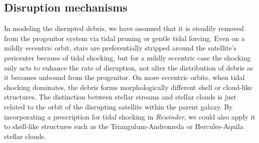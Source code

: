 \documentclass[letterpaper,12pt,preprint]{aastex}
\newcommand{\rewinder}{\emph{Rewinder}}
\begin{document}
\subsection{Disruption mechanisms}
In modeling the disrupted debris, we have assumed that it is steadily removed from the progenitor system via tidal pruning or gentle tidal forcing. Even on a mildly eccentric orbit, stars are preferentially stripped around the satellite's pericenter because of tidal shocking, but for a mildly eccentric case the shocking only acts to enhance the rate of disruption, not alter the distribution of debris as it becomes unbound from the progenitor. On more eccentric orbits, when tidal shocking dominates, the debris forms morphologically different shell or cloud-like structures. The distinction between stellar streams and stellar clouds is just related to the orbit of the disrupting satellite within the parent galaxy. By incorporating a prescription for tidal shocking in \rewinder, we could also apply it to shell-like structures such as the Triangulum-Andromeda \citep{rochapinto04} or Hercules-Aquila \citep{belokurov07b} stellar clouds.
\end{document}
